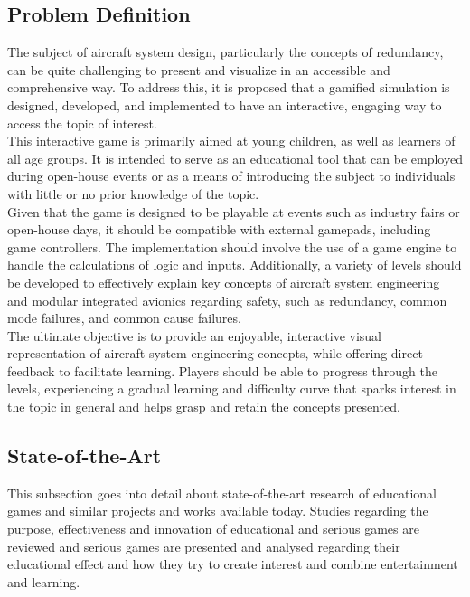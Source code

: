 \subsection{Problem Definition}\label{subsec:problem}
The subject of aircraft system design, particularly the concepts of redundancy, can be quite challenging to present and visualize
in an accessible and comprehensive way.
To address this, it is proposed that a gamified simulation is designed, developed, and implemented to have an interactive, engaging way to access the topic of interest.
\\
This interactive game is primarily aimed at young children, as well as learners of all age groups.
It is intended to serve as an educational tool that can be employed during open-house events or as a means of
introducing the subject to individuals with little or no prior knowledge of the topic.
\\
Given that the game is designed to be playable at events such as industry fairs or open-house days,
it should be compatible with external gamepads, including game controllers.
The implementation should involve the use of a game engine to handle the calculations of logic and inputs.
Additionally, a variety of levels should be developed to effectively explain key concepts of aircraft system engineering and
modular integrated avionics regarding safety, such as redundancy, common mode failures, and common cause failures.
\\
The ultimate objective is to provide an enjoyable, interactive visual representation of aircraft system engineering concepts,
while offering direct feedback to facilitate learning.
Players should be able to progress through the levels, experiencing a gradual learning and difficulty curve that sparks interest in the topic
in general and helps grasp and retain the concepts presented.

\subsection{State-of-the-Art}\label{subsec:state-of-the-art}
This subsection goes into detail about state-of-the-art research of educational games and similar projects and works available
today.
Studies regarding the purpose, effectiveness and innovation of educational and serious games are reviewed and
serious games are presented and analysed regarding their educational effect and how they try to create interest and combine
entertainment and learning.

